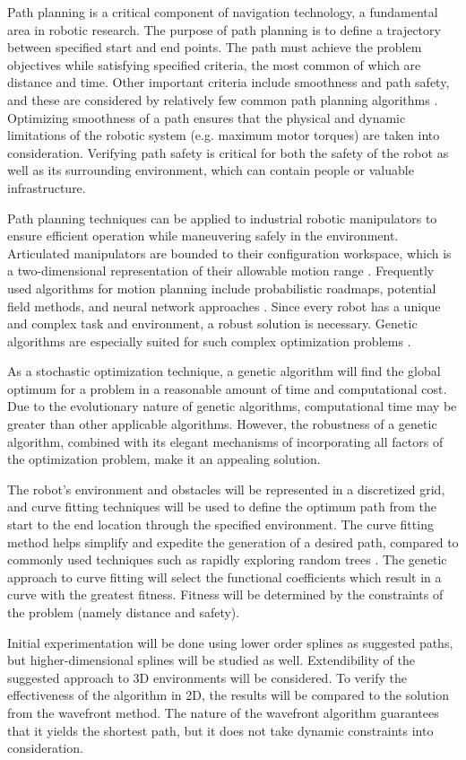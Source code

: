 Path planning is a critical component of navigation technology, a fundamental area in robotic research. The purpose of path planning is to define a trajectory between specified start and end points. The path must achieve the problem objectives while satisfying specified criteria, the most common of which are distance and time. Other important criteria include smoothness and path safety, and these are considered by relatively few common path planning algorithms \cite{elshamli04}. Optimizing smoothness of a path ensures that the physical and dynamic limitations of the robotic system (e.g. maximum motor torques) are taken into consideration. Verifying path safety is critical for both the safety of the robot as well as its surrounding environment, which can contain people or valuable infrastructure.

Path planning techniques can be applied to industrial robotic manipulators to ensure efficient operation while maneuvering safely in the environment. Articulated manipulators are bounded to their configuration workspace, which is a two-dimensional representation of their allowable motion range \cite{kavraki96}. Frequently used algorithms for motion planning include probabilistic roadmaps, potential field methods, and neural network approaches \cite{sharir89,khosla88,rimon92,yang00}. Since every robot has a unique and complex task and environment, a robust solution is necessary. Genetic algorithms are especially suited for such complex optimization problems \cite{renner03}.

As a stochastic optimization technique, a genetic algorithm will find the global optimum for a problem in a reasonable amount of time and computational cost. Due to the evolutionary nature of genetic algorithms, computational time may be greater than other applicable algorithms. However, the robustness of a genetic algorithm, combined with its elegant mechanisms of incorporating all factors of the optimization problem, make it an appealing solution.

The robot's environment and obstacles will be represented in a discretized grid, and curve fitting techniques will be used to define the optimum path from the start to the end location through the specified environment. The curve fitting method helps simplify and expedite the generation of a desired path, compared to commonly used techniques such as rapidly exploring random trees \cite{rodriguez06}. The genetic approach to curve fitting will select the functional coefficients which result in a curve with the greatest fitness. Fitness will be determined by the constraints of the problem (namely distance and safety).

Initial experimentation will be done using lower order splines as suggested paths, but higher-dimensional splines will be studied as well. Extendibility of the suggested approach to 3D environments will be considered. To verify the effectiveness of the algorithm in 2D, the results will be compared to the solution from the wavefront method. The nature of the wavefront algorithm guarantees that it yields the shortest path, but it does not take dynamic constraints into consideration.